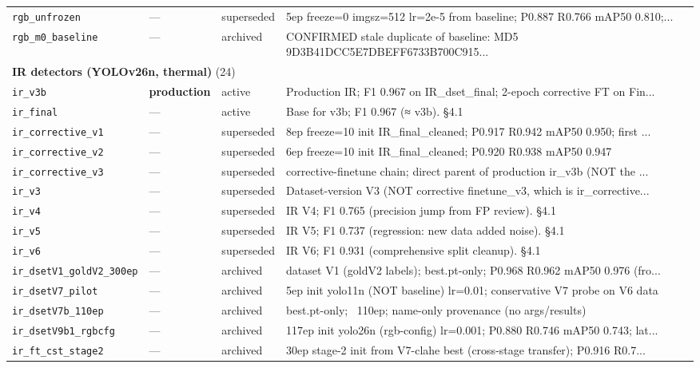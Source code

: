 \documentclass[12pt,a4paper,oneside,openright]{book}
\begin{document}
\begin{longtable}{p{}llp{}}
\texttt{rgb\_unfrozen} & --- & superseded & 5ep freeze=0 imgsz=512 lr=2e-5 from baseline; P0.887 R0.766 mAP50 0.810;... \\
\texttt{rgb\_m0\_baseline} & --- & archived & CONFIRMED stale duplicate of baseline: MD5 9D3B41DCC5E7DBEFF6733B700C915... \\
\midrule
\multicolumn{4}{l}{\textbf{IR detectors (YOLOv26n, thermal)} (24)} \\
\midrule
\texttt{ir\_v3b} & \textbf{production} & active & Production IR; F1 0.967 on IR\_dset\_final; 2-epoch corrective FT on Fin... \\
\texttt{ir\_final} & --- & active & Base for v3b; F1 0.967 (≈ v3b). §4.1 \\
\texttt{ir\_corrective\_v1} & --- & superseded & 8ep freeze=10 init IR\_final\_cleaned; P0.917 R0.942 mAP50 0.950; first ... \\
\texttt{ir\_corrective\_v2} & --- & superseded & 6ep freeze=10 init IR\_final\_cleaned; P0.920 R0.938 mAP50 0.947 \\
\texttt{ir\_corrective\_v3} & --- & superseded & corrective-finetune chain; direct parent of production ir\_v3b (NOT the ... \\
\texttt{ir\_v3} & --- & superseded & Dataset-version V3 (NOT corrective finetune\_v3, which is ir\_corrective... \\
\texttt{ir\_v4} & --- & superseded & IR V4; F1 0.765 (precision jump from FP review). §4.1 \\
\texttt{ir\_v5} & --- & superseded & IR V5; F1 0.737 (regression: new data added noise). §4.1 \\
\texttt{ir\_v6} & --- & superseded & IR V6; F1 0.931 (comprehensive split cleanup). §4.1 \\
\texttt{ir\_dsetV1\_goldV2\_300ep} & --- & archived & dataset V1 (goldV2 labels); best.pt-only; P0.968 R0.962 mAP50 0.976 (fro... \\
\texttt{ir\_dsetV7\_pilot} & --- & archived & 5ep init yolo11n (NOT baseline) lr=0.01; conservative V7 probe on V6 data \\
\texttt{ir\_dsetV7b\_110ep} & --- & archived & best.pt-only; ~110ep; name-only provenance (no args/results) \\
\texttt{ir\_dsetV9b1\_rgbcfg} & --- & archived & 117ep init yolo26n (rgb-config) lr=0.001; P0.880 R0.746 mAP50 0.743; lat... \\
\texttt{ir\_ft\_cst\_stage2} & --- & archived & 30ep stage-2 init from V7-clahe best (cross-stage transfer); P0.916 R0.7... \\

\end{longtable}
\end{document}
